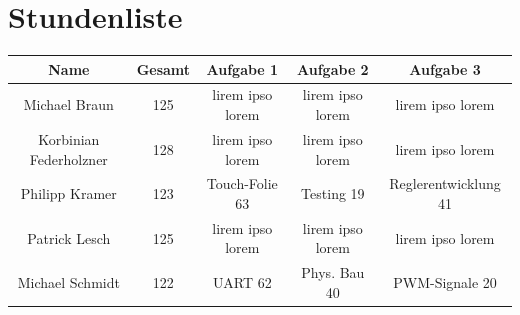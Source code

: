 \documentclass[12pt,a4paper,bibliography=totoc,listof=totoc]{scrartcl}
\begin{document}
\section {Stundenliste}

\begin{table}[htb]
\centering
\begin{tabular}{|c|c|c|c|c|}
\hline
 Name					& Gesamt &Aufgabe 1	&Aufgabe 2	&Aufgabe 3 \\
 \hline
 Michael Braun			&125			&lirem ipso lorem			&lirem ipso lorem			&lirem ipso lorem			\\
 \hline
 Korbinian Federholzner	&128			&lirem ipso lorem			&lirem ipso lorem			&lirem ipso lorem			\\
 \hline
 Philipp Kramer			&123			&Touch-Folie 63			&Testing 19		&Reglerentwicklung 41			\\
 \hline
 Patrick Lesch			&125			&lirem ipso lorem			&lirem ipso lorem			&lirem ipso lorem			\\
 \hline
 Michael Schmidt		&122			&UART 62			& Phys. Bau 40			&PWM-Signale 20			\\
  \hline
\end{tabular}
\label{tab:stundenliste}
\end{table}
\end{document}
